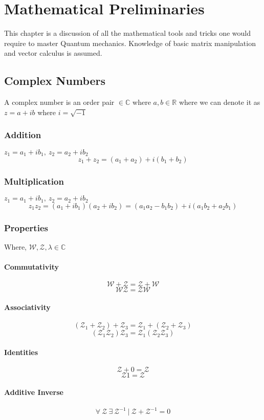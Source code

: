 \chapter{Mathematical Preliminaries}
This chapter is a discussion of all the mathematical tools and tricks one would require to master Quantum mechanics. Knowledge of basic matrix manipulation and vector calculus is assumed.
\section{Complex Numbers}
A complex number is an order pair ${} \in \mathbb{C}$ where $a,b \in \mathbb{R}$ where we can denote it as $z = a + ib$ where $i = \sqrt{-1}$
\subsection{Addition}
$z_{1} = a_{1} + ib_{1}, \ z_{2} = a_{2} + ib_{2}$
$$z_{1} + z_{2} =  (a_{1} + a_{2}) + i(b_{1} + b_{2})$$
\subsection{Multiplication}
$z_{1} = a_{1} + ib_{1}, \ z_{2} = a_{2} + ib_{2}$
$$z_{1}z_{2} =  (a_{1} + ib_{1})(a_{2} + ib_{2}) = (a_{1}a_{2} - b_{1}b_{2}) + i(a_{1}b_{2} + a_{2}b_{1})$$
\subsection{Properties}
Where, $\mathcal{W}, \mathcal{Z}, \lambda \in \mathbb{C}$
\subsubsection{Commutativity}
$$\mathcal{W} + \mathcal{Z} = \mathcal{Z} + \mathcal{W}$$
$$\mathcal{W}\mathcal{Z} = \mathcal{Z}\mathcal{W}$$
\subsubsection{Associativity}
$$(\mathcal{Z}_1 + \mathcal{Z}_2) + \mathcal{Z}_3 = \mathcal{Z}_1 + (\mathcal{Z}_2 + \mathcal{Z}_3)$$
$$(\mathcal{Z}_1\mathcal{Z}_2)\mathcal{Z}_3 = \mathcal{Z}_1(\mathcal{Z}_2\mathcal{Z}_3)$$
\subsubsection{Identities}
$$\mathcal{Z} + 0 = \mathcal{Z}$$
$$\mathcal{Z}1 = \mathcal{Z}$$
\subsubsection{Additive Inverse}
$$\forall \ \mathcal{Z} \ \exists \ \mathcal{Z}^{-1} \ | \ \mathcal{Z} + \mathcal{Z}^{-1} = 0$$
